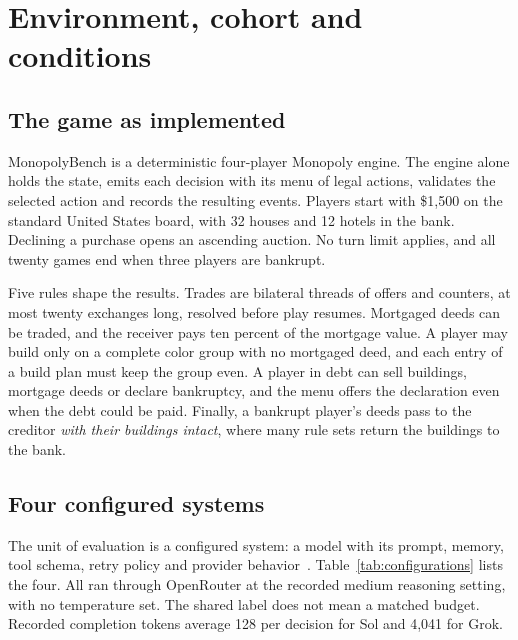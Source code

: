 \section{Environment, cohort and conditions}
\label{sec:setup}

\subsection{The game as implemented}

MonopolyBench is a deterministic four-player Monopoly engine. The engine alone holds the state, emits each decision with its menu of legal actions, validates the selected action and records the resulting events. Players start with \$1,500 on the standard United States board, with 32 houses and 12 hotels in the bank. Declining a purchase opens an ascending auction. No turn limit applies, and all twenty games end when three players are bankrupt.

Five rules shape the results. Trades are bilateral threads of offers and counters, at most twenty exchanges long, resolved before play resumes. Mortgaged deeds can be traded, and the receiver pays ten percent of the mortgage value. A player may build only on a complete color group with no mortgaged deed, and each entry of a build plan must keep the group even. A player in debt can sell buildings, mortgage deeds or declare bankruptcy, and the menu offers the declaration even when the debt could be paid. Finally, a bankrupt player's deeds pass to the creditor \emph{with their buildings intact}, where many rule sets return the buildings to the bank.

\subsection{Four configured systems}

The unit of evaluation is a configured system: a model with its prompt, memory, tool schema, retry policy and provider behavior~\cite{kapoor2026hal,zhang2026dece}. Table~\ref{tab:configurations} lists the four. All ran through OpenRouter at the recorded medium reasoning setting, with no temperature set. The shared label does not mean a matched budget. Recorded completion tokens average 128 per decision for Sol and 4,041 for Grok.

